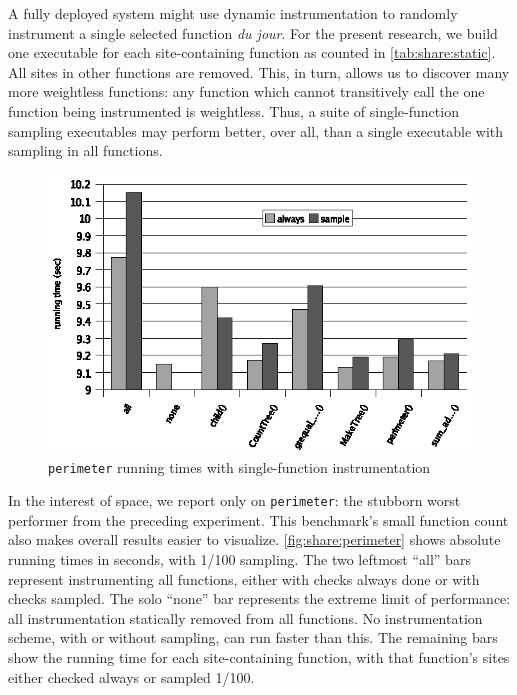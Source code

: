 A fully deployed system might use dynamic instrumentation to randomly
instrument a single selected function \textit{du jour}.  For the
present research, we build one executable for each site-containing
function as counted in \autoref{tab:share:static}.  All sites in other
functions are removed.  This, in turn, allows us to discover many more
weightless functions: any function which cannot transitively call the
one function being instrumented is weightless.  Thus, a suite of
single-function sampling executables may perform better, over all,
than a single executable with sampling in all functions.

\begin{figure}
  \centering
  \includegraphics[width=\columnwidth]{applications/perimeter}
  \caption{\texttt{perimeter} running times with single-function
    instrumentation}
  \label{fig:share:perimeter}
\end{figure}

In the interest of space, we report only on \texttt{perimeter}: the
stubborn worst performer from the preceding experiment.  This
benchmark's small function count also makes overall results easier to
visualize.  \autoref{fig:share:perimeter} shows absolute running times
in seconds, with 1/100 sampling.  The two leftmost ``all'' bars
represent instrumenting all functions, either with checks always done
or with checks sampled.  The solo ``none'' bar represents the extreme
limit of performance: all instrumentation statically removed from all
functions.  No instrumentation scheme, with or without sampling, can
run faster than this.  The remaining bars show the running time for
each site-containing function, with that function's sites either
checked always or sampled 1/100.

